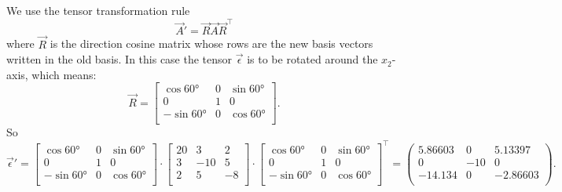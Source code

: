 \begin{derivation}
  We use the tensor transformation rule
\begin{equation*}
    \Vec{A}' = \Vec{R} \Vec{A} \Vec{R}^{\intercal}
  \end{equation*}
  where $\Vec{R}$ is the direction cosine matrix whose rows are the new basis vectors written in the old basis.
  In this case the tensor $\Vec{\epsilon}$ is to be rotated around the $x_2$-axis, which means:
  \begin{equation*}
    \Vec{R} = \begin{bmatrix}
      \cos \ang{60}  & 0 & \sin \ang{60} \\
    0 & 1 & 0\\
    - \sin \ang{60}  & 0 & \cos \ang{60} \\
    \end{bmatrix}
  .\end{equation*}
  So
  \begin{equation*}
    \Vec{\epsilon}' = \begin{bmatrix}
      \cos \ang{60}  & 0 & \sin \ang{60} \\
    0 & 1 & 0\\
    - \sin \ang{60}  & 0 & \cos \ang{60} \\
    \end{bmatrix} \cdot \begin{bmatrix}
      20 & 3 & 2\\
    3 & -10 & 5\\
    2 & 5 & -8\\
    \end{bmatrix} \cdot  \begin{bmatrix}
  \cos \ang{60}  & 0 & \sin \ang{60} \\
0 & 1 & 0\\
- \sin \ang{60}  & 0 & \cos \ang{60} \\
\end{bmatrix}^{\intercal} = \left(
\begin{array}{ccc}
  \num{5.86603} & \num{0}  & \num{5.13397} \\
 0 & -10 & 0 \\
 \num{-14.134} & 0 & \num{ -2.86603} \\
\end{array}
\right)
  .\end{equation*}
\end{derivation}



